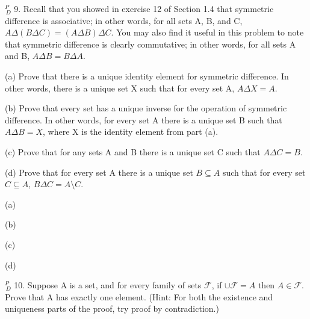 \documentclass{article}
\begin{document}
$^{\textit{P}}_{\, \textit{D}}$ 9. Recall that you showed in exercise 12 of Section 1.4 that symmetric
difference is associative; in other words, for all sets A, B, and C,
$A \Delta (B \Delta C) = (A \Delta B) \Delta C$. You may also find it useful in this problem
to note that symmetric difference is clearly commutative; in other
words, for all sets A and B, $A \Delta B = B \Delta A$.

\hspace{12pt}(a) Prove that there is a unique identity element for symmetric difference.
In other words, there is a unique set X such that for every set
A, $A \Delta X = A$.

\hspace{12pt}(b) Prove that every set has a unique inverse for the operation of symmetric
difference. In other words, for every set A there is a unique set B
such that $A \Delta B = X$, where X is the identity element from part (a).

\hspace{12pt}(c) Prove that for any sets A and B there is a unique set C such that
$A \Delta C = B$.

\hspace{12pt}(d) Prove that for every set A there is a unique set $B \subseteq A$ such that for
every set $C \subseteq A$, $B \Delta C = A \setminus C$.

\vspace{30pt}

(a)

\vspace{30pt}

(b)

\vspace{30pt}

(c)

\vspace{30pt}

(d)

\vspace{30pt}

$^{\textit{P}}_{\, \textit{D}}$ 10. Suppose A is a set, and for every family of sets $\mathcal{F}$, if $\cup \mathcal{F} = A$ then $A \in \mathcal{F}$. Prove that A has exactly one element. (Hint: For both the existence
and uniqueness parts of the proof, try proof by contradiction.)

\vspace{30pt}



\vspace{30pt}
\end{document}
